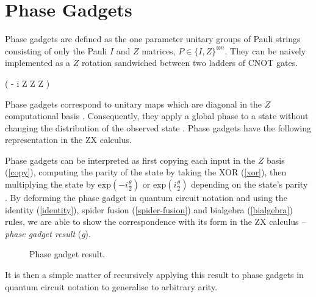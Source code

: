 \section{Phase Gadgets}
Phase gadgets are defined as the one parameter unitary groups of Pauli strings consisting of only the Pauli $I$ and $Z$ matrices, $P \in \{I, Z\}^{\otimes n}$. They can be naively implemented as a $Z$ rotation sandwiched between two ladders of CNOT gates.

{ \left( - i  Z \otimes Z \otimes Z \right)}

Phase gadgets correspond to unitary maps which are diagonal in the $Z$ computational basis \cite{Cowtan2020}. Consequently, they apply a global phase to a state without changing the distribution of the observed state \cite{Yeung2020}. Phase gadgets have the following representation in the ZX calculus.


Phase gadgets can be interpreted as first copying each input in the $Z$ basis (\ref{copy}), computing the parity of the state by taking the XOR (\ref{xor}), then multiplying the state by $\text{exp} \left(-i\frac{\theta}{2} \right)$ or $\text{exp} \left(i\frac{\theta}{2} \right)$ depending on the state's parity \cite{Yeung2020}. By deforming the phase gadget in quantum circuit notation and using the identity (\ref{identity}), spider fusion (\ref{spider-fusion}) and bialgebra (\ref{bialgebra}) rules, we are able to show the correspondence with its form in the ZX calculus -- \textit{phase gadget result} (\textit{g}).

\begin{figure}[H]
    \centering
    \caption{Phase gadget result.}
    \label{phase-gadget-result}
\end{figure}

It is then a simple matter of recursively applying this result to phase gadgets in quantum circuit notation to generalise to arbitrary arity.

